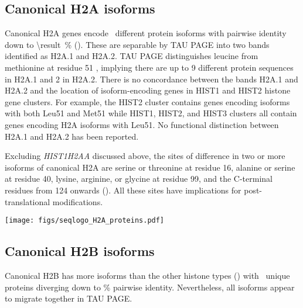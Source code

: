 
  \subsection{Canonical H2A isoforms}
    Canonical H2A genes encode \HTwoAUniqueProteins{}~different
    protein isoforms with pairwise identity down to
     \SI{\result}{\percent} ().
    These are separable by TAU PAGE into two bands identified as H2A.1 and H2A.2.
    TAU PAGE distinguishes leucine from methionine at residue 51 \citep{FranklinZweidler1977,Zweidler1977},
    implying there are up to 9 different protein sequences in H2A.1 and 2 in H2A.2.
    There is no concordance between the bands H2A.1 and H2A.2
    and the location of isoform-encoding genes in HIST1 and HIST2 histone gene clusters.
    For example, the HIST2 cluster contains genes encoding isoforms with both Leu51 and Met51
    while HIST1, HIST2, and HIST3 clusters all contain genes encoding H2A isoforms with Leu51.
    No functional distinction between H2A.1 and H2A.2 has been reported.

    Excluding \textit{HIST1H2AA} discussed above,
    the sites of difference in two or more isoforms of canonical H2A are
    serine or threonine at residue 16,
    alanine or serine at residue 40,
    lysine, arginine, or glycine at residue 99,
    and the C-terminal residues from 124 onwards ().
    All these sites have implications for post-translational modifications.

    \begin{table}
      \caption{%
        Canonical H2A encoded protein isoforms.
        Upper panel shows isoform variations relative to the most numerous protein isoform
        using HGVS recommended nomenclature \citep{mutnomenclature2003}.
        Lower panel shows sequence logo of all isoforms aligned
        with invariant residues in grey.
      }
      \label{tab:H2A-consensus}
      
      \texttt{[image: figs/seqlogo\_H2A\_proteins.pdf]}
    \end{table}

  \subsection{Canonical H2B isoforms}
    Canonical H2B has more isoforms than the other histone types ()
    with \HTwoBUniqueProteins{}~unique proteins
    diverging down to \result\% pairwise identity.
    Nevertheless, all isoforms appear to migrate together in TAU PAGE.

